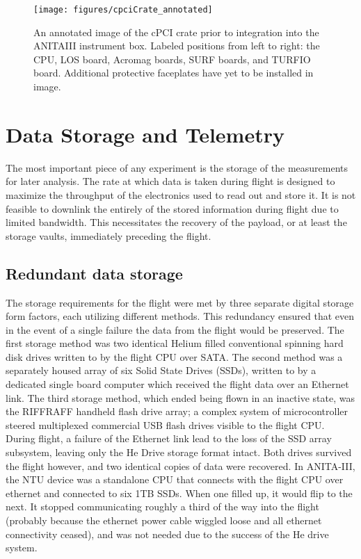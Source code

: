 \begin{figure}
	\centering
	\texttt{[image: figures/cpciCrate\_annotated]}
	\caption{An annotated image of the cPCI crate prior to integration into the ANITAIII instrument box.  Labeled positions from left to right: the CPU, LOS board, Acromag boards, SURF boards, and TURFIO board.  Additional protective faceplates have yet to be installed in image.}
	\label{fig:CPCIcrate}
\end{figure}
	
	
\section{Data Storage and Telemetry}
	The most important piece of any experiment is the storage of the measurements for later analysis.  The rate at which data is taken during flight is designed to maximize the throughput of the electronics used to read out and store it.  It is not feasible to downlink the entirely of the stored information during flight due to limited bandwidth.  This necessitates the recovery of the payload, or at least the storage vaults, immediately preceding the flight.

	\subsection{Redundant data storage}
		The storage requirements for the flight were met by three separate digital storage form factors, each utilizing different methods.  This redundancy ensured that even in the event of a single failure the data from the flight would be preserved.  The first storage method was two identical Helium filled conventional spinning hard disk drives written to by the flight CPU over SATA.  The second method was a separately housed array of six Solid State Drives (SSDs), written to by a dedicated single board computer which received the flight data over an Ethernet link.  The third storage method, which ended being flown in an inactive state, was the RIFFRAFF handheld flash drive array; a complex system of microcontroller steered multiplexed commercial USB flash drives visible to the flight CPU.  During flight, a failure of the Ethernet link lead to the loss of the SSD array subsystem, leaving only the He Drive storage format intact.  Both drives survived the flight however, and two identical copies of data were recovered.
		In ANITA-III, the NTU device was a standalone CPU that connects with the flight CPU over ethernet and connected to six 1TB SSDs.  When one filled up, it would flip to the next.  It stopped communicating roughly a third of the way into the flight (probably because the ethernet power cable wiggled loose and all ethernet connectivity ceased), and was not needed due to the success of the He drive system.
		

